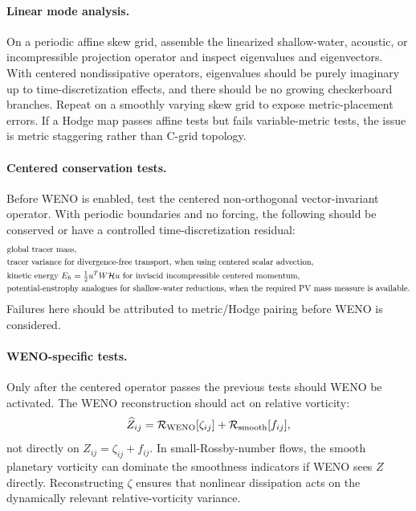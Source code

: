 \documentclass[11pt]{article}
\newcommand{\half}{\tfrac{1}{2}}
\newcommand{\mc}[1]{\mathcal{#1}}
\newcommand{\Recon}{\mc{R}}
\newcommand{\Hodge}{\mc{H}}
\begin{document}
\paragraph{Linear mode analysis.}
On a periodic affine skew grid, assemble the linearized shallow-water, acoustic, or incompressible projection operator and inspect eigenvalues and eigenvectors.  With centered nondissipative operators, eigenvalues should be purely imaginary up to time-discretization effects, and there should be no growing checkerboard branches.  Repeat on a smoothly varying skew grid to expose metric-placement errors.  If a Hodge map passes affine tests but fails variable-metric tests, the issue is metric staggering rather than C-grid topology.

\paragraph{Centered conservation tests.}
Before WENO is enabled, test the centered non-orthogonal vector-invariant operator.  With periodic boundaries and no forcing, the following should be conserved or have a controlled time-discretization residual:
\begin{align}
  &\hbox{global tracer mass}, \\
  &\hbox{tracer variance for divergence-free transport, when using centered scalar advection}, \\
  &\hbox{kinetic energy } E_h=\half u^T W\Hodge u \hbox{ for inviscid incompressible centered momentum}, \\
  &\hbox{potential-enstrophy analogues for shallow-water reductions, when the required PV mass measure is available.}
\end{align}
Failures here should be attributed to metric/Hodge pairing before WENO is considered.

\paragraph{WENO-specific tests.}
Only after the centered operator passes the previous tests should WENO be activated.  The WENO reconstruction should act on relative vorticity:
\begin{equation}
  \widehat Z_{ij}
  =
  \Recon_{\rm WENO}[\zeta_{ij}]
  +
  \Recon_{\rm smooth}[f_{ij}],
  \label{eq:weno-relative-vorticity-reconstruction}
\end{equation}
not directly on \(Z_{ij}=\zeta_{ij}+f_{ij}\).  In small-Rossby-number flows, the smooth planetary vorticity can dominate the smoothness indicators if WENO sees \(Z\) directly.  Reconstructing \(\zeta\) ensures that nonlinear dissipation acts on the dynamically relevant relative-vorticity variance.
\end{document}

